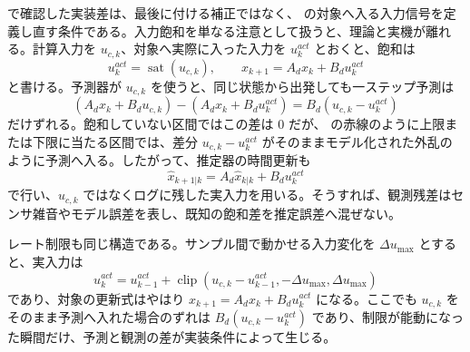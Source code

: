  で確認した実装差は、最後に付ける補正ではなく、 の対象へ入る入力信号を定義し直す条件である。入力飽和を単なる注意として扱うと、理論と実機が離れる。計算入力を $u_{c,k}$、対象へ実際に入った入力を $u_k^{act}$ とおくと、飽和は
\begin{equation}
  u_k^{act}=\operatorname{sat}(u_{c,k}),\qquad
  x_{k+1}=A_dx_k+B_du_k^{act}
\end{equation}
と書ける。予測器が $u_{c,k}$ を使うと、同じ状態から出発しても一ステップ予測は
\begin{equation}
  \left(A_dx_k+B_du_{c,k}\right)
  -\left(A_dx_k+B_du_k^{act}\right)
  =B_d\left(u_{c,k}-u_k^{act}\right)
\end{equation}
だけずれる。飽和していない区間ではこの差は 0 だが、 の赤線のように上限または下限に当たる区間では、差分 $u_{c,k}-u_k^{act}$ がそのままモデル化された外乱のように予測へ入る。したがって、推定器の時間更新も
\begin{equation}
  \hat{x}_{k+1|k}=A_d\hat{x}_{k|k}+B_du_k^{act}
\end{equation}
で行い、$u_{c,k}$ ではなくログに残した実入力を用いる。そうすれば、観測残差はセンサ雑音やモデル誤差を表し、既知の飽和差を推定誤差へ混ぜない。

レート制限も同じ構造である。サンプル間で動かせる入力変化を $\Delta u_{\max}$ とすると、実入力は
\begin{equation}
  u_k^{act}
  =u_{k-1}^{act}
  +\operatorname{clip}
  \left(u_{c,k}-u_{k-1}^{act},-\Delta u_{\max},\Delta u_{\max}\right)
\end{equation}
であり、対象の更新式はやはり $x_{k+1}=A_dx_k+B_du_k^{act}$ になる。ここでも $u_{c,k}$ をそのまま予測へ入れた場合のずれは $B_d(u_{c,k}-u_k^{act})$ であり、制限が能動になった瞬間だけ、予測と観測の差が実装条件によって生じる。

